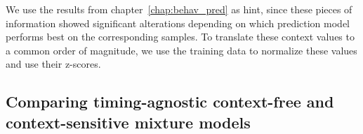 We use the results from chapter~\ref{chap:behav_pred} as hint, since these pieces of information showed significant alterations depending on which prediction model performs best on the corresponding samples.
To translate these context values to a common order of magnitude, we use the training data to normalize these values and use their z-scores.

\subsection{Comparing timing-agnostic context-free and context-sensitive mixture models}%
\label{subsec:comparing_timing_agnostic_context_free_and_context_sensitive_mixture_models}

\begin{figure}[t]
    \centering
\end{figure}
